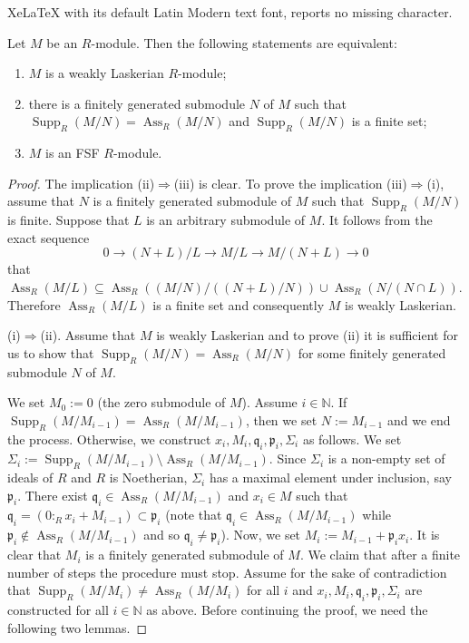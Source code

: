 \documentclass[10pt,a4paper]{amsart}
\newcommand\N{\mathbb N}
\newcommand\ass {\operatorname{Ass}}
\newcommand\fp{\mathfrak p}
\newcommand\fq{\mathfrak q}
\newcommand\supp {\operatorname{Supp}}
\begin{document}
XeLaTeX with its default Latin Modern text font, reports no missing character.
\begin{thm}Let $M$ be an $R$-module. Then the following statements are equivalent:
\begin{enumerate}[\rm(i)]
\item $M$ is a weakly Laskerian $R$-module;
\item there is a finitely generated submodule $N$ of $M$ such that $\supp_R(M/N)=\ass_R(M/N)$ and $\supp_R(M/N)$ is a finite set;
\item $M$ is an FSF $R$-module.
\end{enumerate}
\end{thm}

\begin{proof}
The implication (ii)$\Rightarrow$(iii) is clear. To prove the implication (iii)$\Rightarrow$(i), assume that $N$ is a finitely generated submodule  of $M$ such that $\supp_R(M/N)$ is finite. Suppose that $L$ is an arbitrary submodule of $M$. It follows from the exact sequence
$$0\rightarrow(N+L)/L\rightarrow M/L\rightarrow M/(N+L)\rightarrow 0$$
that $\ass_R(M/L)\subseteq\ass_R((M/N)/((N+L)/N))\cup\ass_R(N/(N\cap L))$. Therefore  $\ass_R(M/L)$ is a finite set and consequently $M$ is weakly Laskerian.

(i)$\Rightarrow$(ii). Assume that $M$ is weakly Laskerian and to prove (ii) it is sufficient for us to show that  $\supp_R(M/N)=\ass_R(M/N)$ for some finitely generated submodule $N$ of $M$.

We set  $M_0:=0$ (the zero submodule of $M$). Assume $i\in\N$.  If $\supp_R(M/M_{i-1})=\ass_R(M/M_{i-1})$, then we set $N:=M_{i-1}$ and we end the process.  Otherwise,  we construct $x_i, M_i,  \fq_i, \fp_i, \Sigma_i$ as follows. We set $\Sigma_i:=\supp_R(M/M_{i-1})\setminus\ass_R(M/M_{i-1})$. Since $\Sigma_i$ is a non-empty set of ideals of $R$ and $R$ is Noetherian,  $\Sigma_i$ has a maximal element under inclusion, say  $\fp_i$.
  There exist $\fq_i\in\ass_R(M/M_{i-1})$ and $x_i\in M$ such that $\fq_i=(0:_Rx_i+M_{i-1})\subset\fp_i$ (note that $\fq_i\in\ass_R(M/M_{i-1})$ while $\fp_i\notin\ass_R(M/M_{i-1})$ and so $\fq_i\neq\fp_i$). Now, we  set $M_i:=M_{i-1}+\fp_ix_i$. It is clear that $M_i$ is a finitely generated submodule of $M$. We claim that after a finite number of steps the procedure must stop.  Assume for the sake of contradiction that $\supp_R(M/M_i)\neq\ass_R(M/M_i)$ for all $i$ and $x_i, M_i,  \fq_i, \fp_i, \Sigma_i$ are constructed for all $i\in\N$ as above. Before continuing the proof, we need the following two lemmas.


\end{proof}
\end{document}

